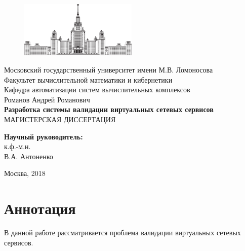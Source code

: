 \documentclass[oneside,final,14pt,a4paper]{extreport}
\begin{document}
\thispagestyle{empty}
\begin{titlepage}

\begin{figure}
	\centering
	\includegraphics[width=0.5\textwidth]{msu}\\
\end{figure}

\begin{spacing}{1.0} %
\begin{center} %
	{\small
		Московский государственный университет имени М.В. Ломоносова \\
		Факультет вычислительной математики и кибернетики \\
		Кафедра автоматизации систем вычислительных комплексов \\
	}
	\vspace{4cm}
	{\large Романов Андрей Романович \\}
	\vspace{1cm}
	{\large\bfseries
	    Разработка системы валидации виртуальных сетевых сервисов \\
	}
	\vspace{1cm}
	МАГИСТЕРСКАЯ ДИССЕРТАЦИЯ
\end{center}
\vfill
\begin{flushright}
\begin{small}
	{\bfseries Научный руководитель: \\}
	к.ф.-м.н. \\
	В.А. Антоненко \\
\end{small}
\end{flushright}

\vfill

\centerline{Москва, 2018}
\end{spacing}
\end{titlepage}

\setcounter{page}{2}  %





\chapter*{Аннотация}
В данной работе рассматривается проблема валидации виртуальных сетевых сервисов.
\end{document}
